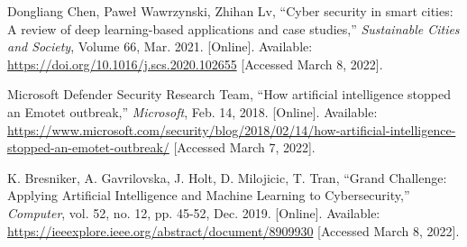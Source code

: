 \begin{thebibliography}{99}
    Dongliang Chen, Paweł Wawrzynski, Zhihan Lv, ``Cyber security in smart cities: A review of deep learning-based applications and case studies,''
    \textit{Sustainable Cities and Society}, Volume 66, Mar. 2021. [Online].
    Available: \href{https://doi.org/10.1016/j.scs.2020.102655}{https://doi.org/10.1016/j.scs.2020.102655}
    [Accessed March 8, 2022].

    Microsoft Defender Security Research Team, ``How artificial intelligence stopped an Emotet outbreak,''
    \textit{Microsoft}, Feb. 14, 2018. [Online].
    Available: \href{https://www.microsoft.com/security/blog/2018/02/14/how-artificial-intelligence-stopped-an-emotet-outbreak/}{https://www.microsoft.com/security/blog/2018/02/14/how-artificial-intelligence-stopped-an-emotet-outbreak/}
    [Accessed March 7, 2022].

    K. Bresniker, A. Gavrilovska, J. Holt, D. Milojicic, T. Tran, ``Grand Challenge: Applying Artificial Intelligence and Machine Learning to Cybersecurity,''
    \textit{Computer}, vol. 52, no. 12, pp. 45-52, Dec. 2019. [Online].
    Available: \href{https://ieeexplore.ieee.org/abstract/document/8909930}{https://ieeexplore.ieee.org/abstract/document/8909930}
    [Accessed March 8, 2022].
\end{thebibliography}
